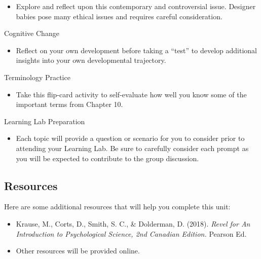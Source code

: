 \documentclass[
]{book}
\providecommand{\tightlist}{%
  \setlength{\itemsep}{0pt}\setlength{\parskip}{0pt}}
\begin{document}
\begin{reflect}
\begin{itemize}
\tightlist
\item
  Explore and reflect upon this contemporary and controversial issue. Designer babies pose many ethical issues and requires careful consideration.
\end{itemize}

{Cognitive Change}

\begin{itemize}
\tightlist
\item
  Reflect on your own development before taking a ``test'' to develop additional insights into your own developmental trajectory.
\end{itemize}

{Terminology Practice}

\begin{itemize}
\tightlist
\item
  Take this flip-card activity to self-evaluate how well you know some of the important terms from Chapter 10.
\end{itemize}

{Learning Lab Preparation}

\begin{itemize}
\tightlist
\item
  Each topic will provide a question or scenario for you to consider prior to attending your Learning Lab. Be sure to carefully consider each prompt as you will be expected to contribute to the group discussion.
\end{itemize}
\end{reflect}

\hypertarget{resources-4}{%
\subsection*{Resources}\label{resources-4}}

Here are some additional resources that will help you complete this unit:

\begin{itemize}
\tightlist
\item
  Krause, M., Corts, D., Smith, S. C., \& Dolderman, D. (2018). \emph{Revel for An Introduction to Psychological Science, 2nd Canadian Edition.} Pearson Ed.\\
\item
  Other resources will be provided online.
\end{itemize}
\end{document}

